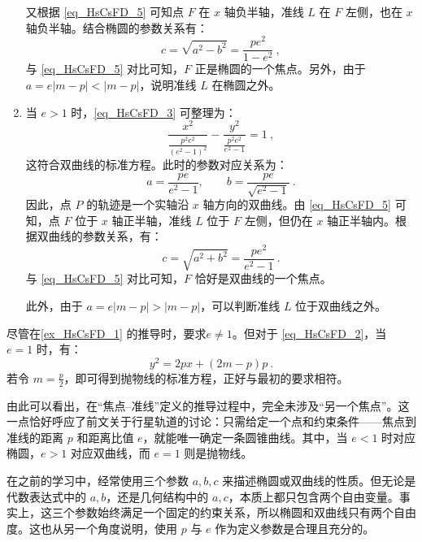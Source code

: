 \begin{example}
\begin{enumerate}
又根据 \autoref{eq_HsCsFD_5} 可知点 $F$ 在 $x$ 轴负半轴，准线 $L$ 在 $F$ 左侧，也在 $x$ 轴负半轴。结合椭圆的参数关系有：
\begin{equation}\label{eq_HsCsFD_6}
c = \sqrt{a^2 - b^2} = \frac{p e^2}{1 - e^2}~,
\end{equation}
与 \autoref{eq_HsCsFD_5} 对比可知，$F$ 正是椭圆的一个焦点。另外，由于 $a = e |m - p| < |m - p|$，说明准线 $L$ 在椭圆之外。

\item 当 $e > 1$ 时，\autoref{eq_HsCsFD_3} 可整理为：
\begin{equation}
\frac{x^2}{\displaystyle\frac{p^2 e^2}{(e^2 - 1)^2}} - \frac{y^2}{\displaystyle\frac{p^2 e^2}{e^2 - 1}} = 1~,
\end{equation}
这符合双曲线的标准方程。此时的参数对应关系为：
\begin{equation}
a = \frac{p e}{e^2 - 1}, \qquad b = \frac{p e}{\sqrt{e^2 - 1}}~.
\end{equation}
因此，点 $P$ 的轨迹是一个实轴沿 $x$ 轴方向的双曲线。由 \autoref{eq_HsCsFD_5} 可知，点 $F$ 位于 $x$ 轴正半轴，准线 $L$ 位于 $F$ 左侧，但仍在 $x$ 轴正半轴内。根据双曲线的参数关系，有：
\begin{equation}
c = \sqrt{a^2 + b^2} = \frac{p e^2}{e^2 - 1}~.
\end{equation}
与 \autoref{eq_HsCsFD_5} 对比可知，$F$ 恰好是双曲线的一个焦点。

此外，由于 $a = e |m - p| > |m - p|$，可以判断准线 $L$ 位于双曲线之外。
\end{enumerate}
\end{example}

尽管在\autoref{ex_HsCsFD_1} 的推导时，要求$e\neq1$。但对于 \autoref{eq_HsCsFD_2}，当 $e = 1$ 时，有：
\begin{equation}
y^2 = 2px + (2m - p)p~.
\end{equation}
若令 $\displaystyle m = \frac{p}{2}$，即可得到抛物线的标准方程，正好与最初的要求相符。

由此可以看出，在“焦点–准线”定义的推导过程中，完全未涉及“另一个焦点”。这一点恰好呼应了前文关于行星轨道的讨论：只需给定一个点和约束条件——焦点到准线的距离 $p$ 和距离比值 $e$，就能唯一确定一条圆锥曲线。其中，当 $e < 1$ 时对应椭圆，$e > 1$ 对应双曲线，而 $e = 1$ 则是抛物线。

在之前的学习中，经常使用三个参数 $a, b, c$ 来描述椭圆或双曲线的性质。但无论是代数表达式中的 $a, b$，还是几何结构中的 $a, c$，本质上都只包含两个自由变量。事实上，这三个参数始终满足一个固定的约束关系，所以椭圆和双曲线只有两个自由度。这也从另一个角度说明，使用 $p$ 与 $e$ 作为定义参数是合理且充分的。

